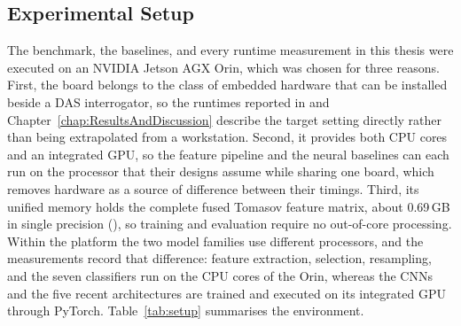 \subsection{Experimental Setup}
\label{sec:chap3ExperimentalSetup}
The benchmark, the baselines, and every runtime measurement in this thesis were executed on an NVIDIA Jetson AGX Orin, which was chosen for three reasons. First, the board belongs to the class of embedded hardware that can be installed beside a DAS interrogator, so the runtimes reported in  and Chapter~\ref{chap:ResultsAndDiscussion} describe the target setting directly rather than being extrapolated from a workstation. Second, it provides both CPU cores and an integrated GPU, so the feature pipeline and the neural baselines can each run on the processor that their designs assume while sharing one board, which removes hardware as a source of difference between their timings. Third, its unified memory holds the complete fused Tomasov feature matrix, about 0.69\,GB in single precision (), so training and evaluation require no out-of-core processing. Within the platform the two model families use different processors, and the measurements record that difference: feature extraction, selection, resampling, and the seven classifiers run on the CPU cores of the Orin, whereas the CNNs and the five recent architectures are trained and executed on its integrated GPU through PyTorch. Table~\ref{tab:setup} summarises the environment.

